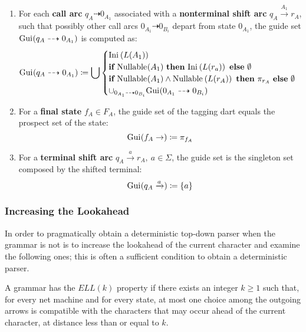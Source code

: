 \documentclass[english]{article}
\begin{document}
\begin{enumerate}
  \item For each \textbf{call arc} \(q_A \dashrightarrow 0_{A_1}\) associated with a \textbf{nonterminal shift arc} \(q_A \xrightarrow{A_1} r_A\), such that possibly other call arcs \(0_{A_1} \dashrightarrow 0_{B_i}\) depart from state \(0_{A_1}\), the guide set \(\text{Gui}\hspace{0.1ex}(q_A \dashrightarrow 0_{A_1})\) is computed as:
        \[ \text{Gui}\hspace{0.1ex}(q_A \dashrightarrow 0_{A_1}) \coloneqq \bigcup \begin{cases}
            \text{Ini}\hspace{0.1ex}\left( L(A_1) \right)                                                                                                 \\
            \textbf{if} \ \text{Nullable}\hspace{0.1ex}(A_1) \ \textbf{then} \ \text{Ini}\hspace{0.1ex}\left( L(r_a) \right) \ \textbf{else} \ \emptyset                      \\
            \textbf{if} \ \text{Nullable}\hspace{0.1ex}(A_1) \land \text{Nullable}\hspace{0.1ex}\left( L(r_A) \right) \ \textbf{then} \ \pi_{r_A} \ \textbf{else} \ \emptyset \\
            \cup_{0_{A_1} \dashrightarrow 0_{B_i}} \text{Gui}\hspace{0.1ex}(0_{A_1} \dashrightarrow 0_{B_i})
          \end{cases}\]
  \item For a \textbf{final state} \(f_A \in F_A\), the guide set of the tagging dart equals the prospect set of the state:
        \[ \text{Gui}\hspace{0.1ex}(f_A \rightarrow) \coloneqq \pi_{f_A} \]
  \item For a \textbf{terminal shift arc} \(q_A \xrightarrow{a} r_A, \ a \in \Sigma\), the guide set is the singleton set composed by the shifted terminal:
        \[ \text{Gui}\hspace{0.1ex}(q_A \xrightarrow{a}) \coloneqq \left\{ a \right\} \]
\end{enumerate}

\subsubsection{Increasing the Lookahead}

In order to pragmatically obtain a deterministic top-down parser when the grammar is not \ello is to increase the lookahead of the current character and examine the following ones;
this is often a sufficient condition to obtain a deterministic parser.

A grammar has the \(\textit{ELL}(k)\) property if there exists an integer \(k \geq 1\) such that, for every net machine and for every state, at most one choice among the outgoing arrows is compatible with the characters that may occur ahead of the current character, at distance less than or equal to \(k\).
\end{document}
